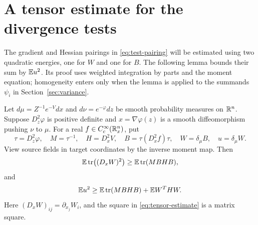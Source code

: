 \section{A tensor estimate for the divergence tests}\label{sec:tensor}

The gradient and Hessian pairings in \eqref{eq:test-pairing} will be
estimated using two quadratic energies, one for $W$ and one for $B$.
The following lemma bounds their sum by $\mathbb E u^2$. Its proof uses weighted
integration by parts and the moment equation; homogeneity enters only
when the lemma is applied to the summands $\psi_i$ in
Section~\ref{sec:variance}.

\begin{lemma}\label{lem:tensor}
Let $d\mu=Z^{-1}e^{-V}dx$ and $d\nu=e^{-\varphi}dz$ be smooth
probability measures on $\mathbb R^n$.  Suppose $D_z^2\varphi$ is positive
definite and $x=\nabla\varphi(z)$ is a smooth diffeomorphism pushing
$\nu$ to $\mu$.
For a real $f\in C_c^\infty(\mathbb R_x^n)$, put
\[
 \tau=D_z^2\varphi,\quad M=\tau^{-1},\quad H=D_x^2V,
 \quad B=\tau(D_x^2f)\tau,
 \quad W=\delta_\mu B,
 \quad u=\delta_\mu W.
\]
View source fields in target coordinates by the inverse moment map.
Then
\begin{equation}\label{eq:tensor-estimate}
 \mathbb E\operatorname{tr}\bigl((D_xW)^2\bigr)
 \ge \mathbb E\operatorname{tr}(MBHB),
\end{equation}
and
\begin{equation}\label{eq:tensor-energy}
 \mathbb E u^2\ge\mathbb E\operatorname{tr}(MBHB)+\mathbb E W^THW.
\end{equation}
Here $(D_xW)_{ij}=\partial_{x_j}W_i$, and the square in
\eqref{eq:tensor-estimate} is a matrix square.
\end{lemma}

